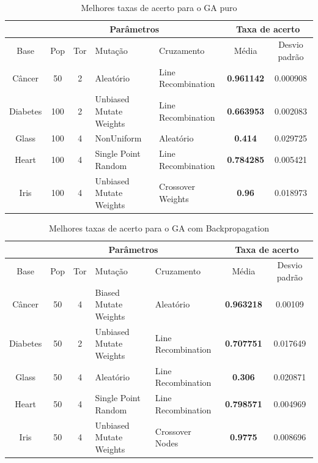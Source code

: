 \documentclass[12pt]{article}
\begin{document}
\begin{table}[h]
\center
\begin{tabular}{c|c|c|p{3cm}|p{3cm}|c|c|}
\cline{2-7}
&  \multicolumn{4}{|c|}{Parâmetros} & \multicolumn{2}{|c|}{Taxa de acerto} \\ \hline
\multicolumn{1}{|c|}{Base} & Pop & Tor & Mutação & Cruzamento & Média & Desvio padrão  \\ \hline
\multicolumn{1}{|c|}{Câncer} & 50 & 2 & Aleatório & Line Recombination & \textbf{0.961142} & 0.000908 \\ \hline
\multicolumn{1}{|c|}{Diabetes} & 100 & 2 & Unbiased Mutate Weights & Line Recombination & \textbf{0.663953} & 0.002083 \\ \hline
\multicolumn{1}{|c|}{Glass} & 100 & 4 & NonUniform & Aleatório & \textbf{0.414} & 0.029725 \\ \hline 
\multicolumn{1}{|c|}{Heart} & 100 & 4 & Single Point Random & Line Recombination & \textbf{0.784285} & 0.005421 \\ \hline
\multicolumn{1}{|c|}{Iris} & 100 & 4 & Unbiased Mutate Weights & Crossover Weights & \textbf{0.96} & 0.018973 \\ \hline
\end{tabular}
\caption{Melhores taxas de acerto para o GA puro}
\label{tab:hitbest}
\end{table}

\begin{table}[h]
\center
\begin{tabular}{c|c|c|p{3cm}|p{3cm}|c|c|}
\cline{2-7}
&  \multicolumn{4}{|c|}{Parâmetros} & \multicolumn{2}{|c|}{Taxa de acerto} \\ \hline
\multicolumn{1}{|c|}{Base} & Pop & Tor & Mutação & Cruzamento & Média & Desvio padrão  \\ \hline
\multicolumn{1}{|c|}{Câncer} & 50 & 4 & Biased Mutate Weights & Aleatório & \textbf{0.963218} & 0.00109 \\ \hline
\multicolumn{1}{|c|}{Diabetes} & 50 & 2 & Unbiased Mutate Weights & Line Recombination & \textbf{0.707751} & 0.017649 \\ \hline
\multicolumn{1}{|c|}{Glass} & 50 & 4 & Aleatório & Line Recombination & \textbf{0.306} & 0.020871 \\ \hline 
\multicolumn{1}{|c|}{Heart} & 50 & 4 & Single Point Random & Line Recombination & \textbf{0.798571} & 0.004969 \\ \hline
\multicolumn{1}{|c|}{Iris} & 50 & 4 & Unbiased Mutate Weights & Crossover Nodes & \textbf{0.9775} & 0.008696 \\ \hline
\end{tabular}
\caption{Melhores taxas de acerto para o GA com Backpropagation}
\label{tab:hitbest2}
\end{table}
\end{document}
